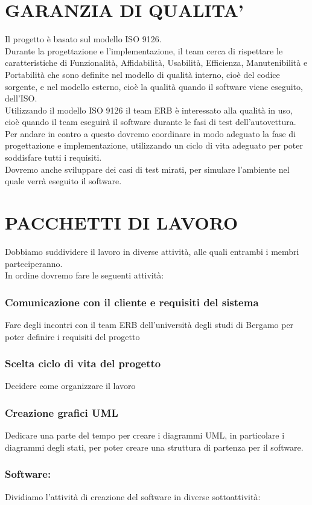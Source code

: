 \documentclass{report}
\begin{document}
\chapter{GARANZIA DI QUALITA'}
Il progetto è basato sul modello ISO 9126.\\
Durante la progettazione e l'implementazione, il team cerca di rispettare le caratteristiche di Funzionalità, Affidabilità, Usabilità, Efficienza, Manutenibilità e Portabilità che sono definite nel modello di qualità interno, cioè del codice sorgente, e nel modello esterno, cioè la qualità quando il software viene eseguito, dell'ISO.\\
Utilizzando il modello ISO 9126 il team ERB è interessato alla qualità in uso, cioè quando il team eseguirà il software durante le fasi di test dell'autovettura.\\
Per andare in contro a questo dovremo coordinare in modo adeguato la fase di progettazione e implementazione, utilizzando un ciclo di vita adeguato per poter soddisfare tutti i requisiti.\\
Dovremo anche sviluppare dei casi di test mirati, per simulare l'ambiente nel quale verrà eseguito il software.


\chapter{PACCHETTI DI LAVORO}
Dobbiamo suddividere il lavoro in diverse attività, alle quali entrambi i membri parteciperanno.\\
In ordine dovremo fare le seguenti attività:
\subsection*{Comunicazione con il cliente e requisiti del sistema}
Fare degli incontri con il team ERB dell'università degli studi di Bergamo per poter definire i requisiti del progetto
\subsection{Scelta ciclo di vita del progetto}
Decidere come organizzare il lavoro
\subsection*{Creazione grafici UML}
Dedicare una parte del tempo per creare i diagrammi UML, in particolare i diagrammi degli stati, per poter creare una struttura di partenza per il software.
\subsection*{Software:}
Dividiamo l'attività di creazione del software in diverse sottoattività:
\end{document}

